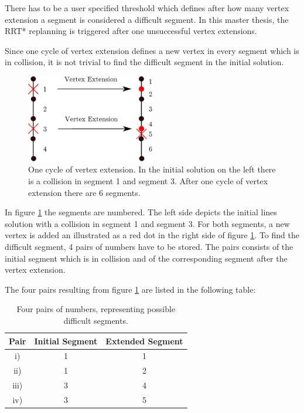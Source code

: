 There has to be a user specified threshold which defines after how many vertex extension a segment is considered a difficult segment. In this master thesis, the RRT* replanning is triggered after one unsuccessful vertex extensions.\newline

Since one cycle of vertex extension defines a new vertex in every segment which is in collision, it is not trivial to find the difficult segment in the initial solution.

\begin{figure}[H]
   \centering
   \includegraphics[width=0.5\textwidth]{pics/recogniseSegment.eps}
   \caption{One cycle of vertex extension. In the initial solution on the left there is a collision in segment 1 and segment 3. After one cycle of vertex extension there are 6 segments. }
   \label{pic:recognise}
\end{figure}

In figure \ref{pic:recognise} the segments are numbered. The left side depicts the initial lines solution with a collision in segment 1 and segment 3. For both segments, a new vertex is added an illustrated as a red dot in the right side of figure \ref{pic:recognise}. To find the difficult segment, 4 pairs of numbers have to be stored. The pairs consists of the initial segment which is in collision and of the corresponding segment after the vertex extension. \newline

The four pairs resulting from figure \ref{pic:recognise} are listed in the following table:

\begin{table}[H] 
\begin{center}
    \begin{tabular}{| c | c | c | }
    \hline
    Pair & Initial Segment & Extended Segment\\ \hline
   i) & 1 & 1 \\ \hline
   ii) & 1 & 2\\ \hline
   iii) & 3 & 4\\ \hline
   iv) & 3 & 5\\
    \hline
    \end{tabular}
    \caption{Four pairs of numbers, representing possible difficult segments.}
    \label{tab:pairsOfNumbers}
\end{center}
\end{table}


